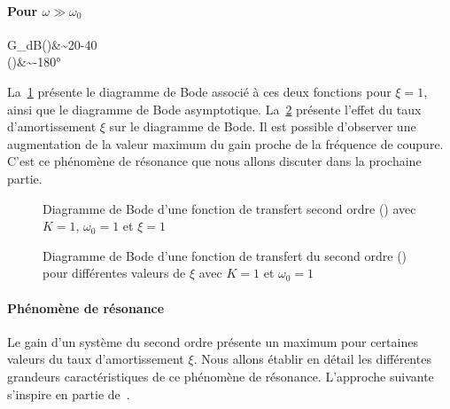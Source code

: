 \paragraph{Pour $\omega \gg\omega_0$}
\begin{bequation}
G_{dB}(\omega)&\sim20-40\log\omega\\
    \phi(\omega)&\sim-180\si{\degree}
\end{bequation}
La~\cref{fig-bode_2nd_1} présente le diagramme de Bode associé à ces deux 
fonctions pour $\xi=1$, ainsi que le diagramme de Bode asymptotique. 
La~\cref{fig-bode_2nd_2} présente l'effet du taux d'amortissement $\xi$ sur 
le diagramme de Bode. Il est possible d'observer une augmentation de la valeur 
maximum du gain proche de la fréquence de coupure.
C'est ce phénomène de résonance que nous allons discuter dans la 
prochaine partie.
\begin{figure}[!t]
    \centering
    

    
    \caption{Diagramme de Bode d'une fonction de transfert second ordre 
    () avec $K=1$, $\omega_0=1$ et $\xi=1$
    \label{fig-bode_2nd_1}}
\end{figure}
\begin{figure}[!t]
    \centering
    
    \caption{Diagramme de Bode d'une fonction de transfert du second ordre 
             () pour différentes valeurs de $\xi$ avec 
             $K=1$ et $\omega_0=1$\label{fig-bode_2nd_2}}
\end{figure}
\afterpage{\clearpage}
\paragraph{Phénomène de résonance}
Le gain d'un système du second ordre présente un maximum pour certaines valeurs 
du taux d'amortissement $\xi$. Nous allons établir en détail les différentes 
grandeurs caractéristiques de ce phénomène de résonance. 
L'approche suivante s'inspire en partie de~\cite{laroche}.

